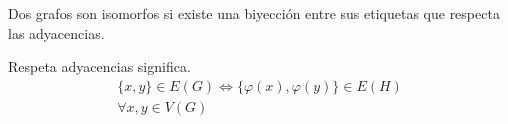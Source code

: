 \documentclass[../main.tex]{subfiles}
\begin{document}
Dos grafos son isomorfos si existe una biyección entre sus etiquetas que
respecta las adyacencias.

\begin{figure}[H]
	\centering
	
\end{figure}

Respeta adyacencias significa.
\begin{gather*}
	\{x,y\}\in E(G) \Longleftrightarrow \{\varphi(x),\varphi(y)\}\in E(H)\\
	\forall x,y\in V(G)
\end{gather*}

\begin{figure}[H]
	\centering
	
\end{figure}
\end{document}
